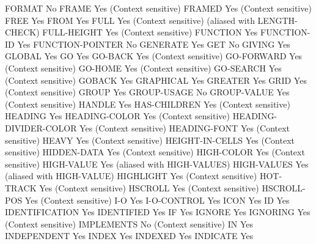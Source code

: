FORMAT                          No
FRAME                           Yes (Context sensitive)
FRAMED                          Yes (Context sensitive)
FREE                            Yes
FROM                            Yes
FULL                            Yes (Context sensitive) (aliased with LENGTH-CHECK)
FULL-HEIGHT                     Yes (Context sensitive)
FUNCTION                        Yes
FUNCTION-ID                     Yes
FUNCTION-POINTER                No
GENERATE                        Yes
GET                             No
GIVING                          Yes
GLOBAL                          Yes
GO                              Yes
GO-BACK                         Yes (Context sensitive)
GO-FORWARD                      Yes (Context sensitive)
GO-HOME                         Yes (Context sensitive)
GO-SEARCH                       Yes (Context sensitive)
GOBACK                          Yes
GRAPHICAL                       Yes
GREATER                         Yes
GRID                            Yes (Context sensitive)
GROUP                           Yes
GROUP-USAGE                     No
GROUP-VALUE                     Yes (Context sensitive)
HANDLE                          Yes
HAS-CHILDREN                    Yes (Context sensitive)
HEADING                         Yes
HEADING-COLOR                   Yes (Context sensitive)
HEADING-DIVIDER-COLOR           Yes (Context sensitive)
HEADING-FONT                    Yes (Context sensitive)
HEAVY                           Yes (Context sensitive)
HEIGHT-IN-CELLS                 Yes (Context sensitive)
HIDDEN-DATA                     Yes (Context sensitive)
HIGH-COLOR                      Yes (Context sensitive)
HIGH-VALUE                      Yes (aliased with HIGH-VALUES)
HIGH-VALUES                     Yes (aliased with HIGH-VALUE)
HIGHLIGHT                       Yes (Context sensitive)
HOT-TRACK                       Yes (Context sensitive)
HSCROLL                         Yes (Context sensitive)
HSCROLL-POS                     Yes (Context sensitive)
I-O                             Yes
I-O-CONTROL                     Yes
ICON                            Yes
ID                              Yes
IDENTIFICATION                  Yes
IDENTIFIED                      Yes
IF                              Yes
IGNORE                          Yes
IGNORING                        Yes (Context sensitive)
IMPLEMENTS                      No (Context sensitive)
IN                              Yes
INDEPENDENT                     Yes
INDEX                           Yes
INDEXED                         Yes
INDICATE                        Yes
